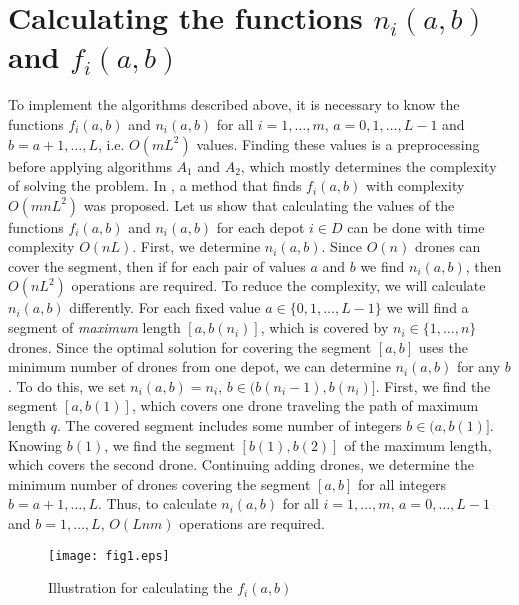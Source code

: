 \documentclass[runningheads]{llncs}
\begin{document}
\section{Calculating the functions $n_i(a,b)$ and $f_i(a,b)$}
To implement the algorithms described above, it is necessary to know the functions $f_i(a,b)$ and $n_i(a,b)$ for all $i=1,\ldots,m$, $a=0,1,\ldots,L-1$ and $b=a+1,\ldots,L$, i.e. $O(mL^2)$ values. Finding these values is a preprocessing before applying algorithms $A_1$ and $A_2$, which mostly determines the complexity of solving the problem. In \cite{ErShad24}, a method that finds $f_i(a,b)$ with complexity $O(mnL^2)$ was proposed. Let us show that calculating the values of the functions $f_i(a,b)$ and $n_i(a,b)$ for each depot $i\in D$ can be done with time complexity $O(nL)$. First, we determine $n_i(a,b)$. Since $O(n)$ drones can cover the segment, then if for each pair of values $a$ and $b$ we find $n_i(a,b)$, then $O(nL^2)$ operations are required. To reduce the complexity, we will calculate $n_i(a,b)$ differently. For each fixed value $a\in\{0,1,\ldots,L-1\}$ we will find a segment of \emph{maximum} length $[a,b(n_i)]$, which is covered by $n_i\in\{1,\ldots,n\}$ drones. Since the optimal solution for covering the segment $[a,b]$ uses the minimum number of drones from one depot, we can determine $n_i(a,b)$ for any $b$. To do this, we set $n_i(a,b)=n_i$, $b\in(b(n_i-1),b(n_i)]$. First, we find the segment $[a,b(1)]$, which covers one drone traveling the path of maximum length $q$. The covered segment includes some number of integers $b\in(a,b(1)]$. Knowing $b(1)$, we find the segment $[b(1),b(2)]$ of the maximum length, which covers the second drone. Continuing adding drones, we determine the minimum number of drones covering the segment $[a,b]$ for all integers $b=a+1,\ldots,L$. Thus, to calculate $n_i(a,b)$ for all $i=1,\ldots,m$, $a=0,\ldots,L-1$ and $b=1,\ldots,L$, $O(Lnm)$ operations are required.

\begin{figure}
\centering
\texttt{[image: fig1.eps]}
\caption{Illustration for calculating the $f_i(a,b)$}
\label{fig1}
\end{figure}
\end{document}
